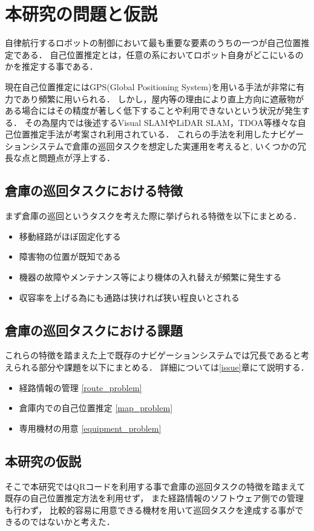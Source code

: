 \section{本研究の問題と仮説}
自律航行するロボットの制御において最も重要な要素のうちの一つが自己位置推定である．
自己位置推定とは，任意の系においてロボット自身がどこにいるのかを推定する事である．

現在自己位置推定にはGPS(Global Positioning System)を用いる手法が非常に有力であり頻繁に用いられる．
しかし，屋内等の理由により直上方向に遮蔽物がある場合にはその精度が著しく低下することや利用できないという状況が発生する．
その為屋内では後述するVisual SLAMやLiDAR SLAM，TDOA等様々な自己位置推定手法が考案され利用されている．
これらの手法を利用したナビゲーションシステムで倉庫の巡回タスクを想定した実運用を考えると,
いくつかの冗長な点と問題点が浮上する．

\subsection{倉庫の巡回タスクにおける特徴}
まず倉庫の巡回というタスクを考えた際に挙げられる特徴を以下にまとめる．
\begin{itemize}
    \item 移動経路がほぼ固定化する
    \item 障害物の位置が既知である
    \item 機器の故障やメンテナンス等により機体の入れ替えが頻繁に発生する
    \item 収容率を上げる為にも通路は狭ければ狭い程良いとされる
\end{itemize}

\subsection{倉庫の巡回タスクにおける課題}
これらの特徴を踏まえた上で既存のナビゲーションシステムでは冗長であると考えられる部分や課題を以下にまとめる．
詳細については\ref{issue}章にて説明する．
\begin{itemize}
    \item 経路情報の管理 \ref{route_problem}
    \item 倉庫内での自己位置推定 \ref{map_problem}
    \item 専用機材の用意 \ref{equipment_problem}
\end{itemize}

\subsection{本研究の仮説}
そこで本研究ではQRコードを利用する事で倉庫の巡回タスクの特徴を踏まえて既存の自己位置推定方法を利用せず，
また経路情報のソフトウェア側での管理も行わず，
比較的容易に用意できる機材を用いて巡回タスクを達成する事ができるのではないかと考えた．